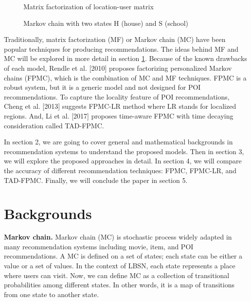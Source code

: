 \documentclass{sig-alternate}
\begin{document}
\begin{figure*}
\centering
{}
\caption{Matrix factorization of location-user matrix}
\label{fig:MF}
\end{figure*}

\begin{figure}
\centering
{}
\caption{Markov chain with two states H (house) and S (school)}
\label{fig:MarkovChain}
\end{figure}

Traditionally, matrix factorization (MF) or Markov chain (MC) have been popular techniques for producing recommendations.
The ideas behind MF and MC will be explored in more detail in section \ref{sec:backgrounds}. 
Because of the known drawbacks of each model, Rendle et al. [2010] proposes factorizing personalized 
Markov chains (FPMC), which is the combination of MC and MF techniques. FPMC is a robust system, 
but it is a generic model and not designed for POI recommendations. To capture the locality feature of 
POI recommendations, Cheng et al. [2013] suggests FPMC-LR method where LR stands for localized regions. 
And, Li et al. [2017] proposes time-aware FPMC with time decaying consideration called TAD-FPMC.

In section 2, we are going to cover general and mathematical backgrounds in recommendation systems 
to understand the proposed models. Then in section 3, we will explore the proposed approaches in detail. 
In section 4, we will compare the accuracy of different recommendation techniques: FPMC, FPMC-LR, and TAD-FPMC. 
Finally, we will conclude the paper in section 5.



\section{Backgrounds}
\label{sec:backgrounds}


\textbf{Markov chain.} Markov chain (MC) is stochastic process widely adapted in many recommendation systems 
including movie, item, and POI recommendations. A MC is defined on a set of states; each state can be either a value
or a set of values. In the context of LBSN, each state represents a place where users can visit.
Now, we can define MC as a collection of transitional probabilities among different states.
In other words, it is a map of transitions from one state to another state. 
\end{document}

